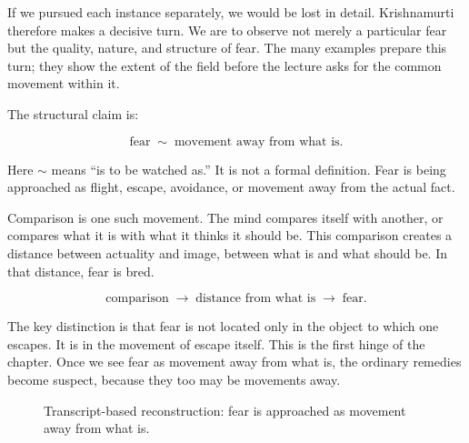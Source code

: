 If we pursued each instance separately, we would be lost in detail. Krishnamurti therefore makes a decisive turn. We are to observe not merely a particular fear but the quality, nature, and structure of fear. The many examples prepare this turn; they show the extent of the field before the lecture asks for the common movement within it.

The structural claim is:

\begin{equation}
\text{fear}
\;\sim\;
\text{movement away from what is}.
\end{equation}

Here \(\sim\) means ``is to be watched as.'' It is not a formal definition. Fear is being approached as flight, escape, avoidance, or movement away from the actual fact.

Comparison is one such movement. The mind compares itself with another, or compares what it is with what it thinks it should be. This comparison creates a distance between actuality and image, between what is and what should be. In that distance, fear is bred.

\begin{equation}
\text{comparison}
\;\longrightarrow\;
\text{distance from what is}
\;\longrightarrow\;
\text{fear}.
\end{equation}

The key distinction is that fear is not located only in the object to which one escapes. It is in the movement of escape itself. This is the first hinge of the chapter. Once we see fear as movement away from what is, the ordinary remedies become suspect, because they too may be movements away.

\begin{figure}
\centering
{}
\caption{Transcript-based reconstruction: fear is approached as movement away from what is.}
\end{figure}

